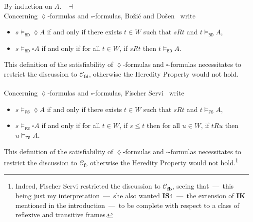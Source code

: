 \documentclass[draft]{article}
\newenvironment{proof}{{\bf Proof:}}{~$\dashv$\\}
\def\fcfra{\mathbf{f}}
\def\fbcfra{\mathbf{fb}}
\def\fdcfra{\mathbf{fd}}
\def\IS{\mathbf{IS}}
\def\IK{\mathbf{IK}}
\begin{document}
%
%
\begin{proof}
%
%
By induction on $A$.
%
%
\medskip
%
%
\end{proof}
%
%
%
%
Concerning $\lozenge$-formulas and $\square$-formulas, Bo\v{z}i\'{c} and Do\v{s}en~\cite{Bozic:Dosen:1984} write
%
%
\begin{itemize}
%
%
\item $s{\models_{\mathtt{BD}}}{\lozenge}A$ if and only if there exists $t{\in}W$ such that $s{R}t$ and $t{\models_{\mathtt{BD}}}A$,
%
%
%
%
\item $s{\models_{\mathtt{BD}}}{\square}A$ if and only if for all $t{\in}W$, if $s{R}t$ then $t{\models_{\mathtt{BD}}}A$.
%
%
%
%
\end{itemize}
%
%
%
%
This definition of the satisfiability of $\lozenge$-formulas and $\square$-formulas necessitates to restrict the discussion to ${\mathcal C}_{\fdcfra}$, otherwise the Heredity Property would not hold.
%
%
\\
\\
%
%
Concerning $\lozenge$-formulas and $\square$-formulas, Fischer Servi~\cite{FischerServi:1984} write
%
%
\begin{itemize}
%
%
\item $s{\models_{\mathtt{FS}}}{\lozenge}A$ if and only if there exists $t{\in}W$ such that $s{R}t$ and $t{\models_{\mathtt{FS}}}A$,
%
%
%
%
\item $s{\models_{\mathtt{FS}}}{\square}A$ if and only if for all $t{\in}W$, if $s{\leq}t$ then for all $u{\in}W$, if $t{R}u$ then $u{\models_{\mathtt{FS}}}A$.
%
%
%
%
\end{itemize}
%
%
%
%
This definition of the satisfiability of $\lozenge$-formulas and $\square$-formulas necessitates to restrict the discussion to ${\mathcal C}_{\fcfra}$, otherwise the Heredity Property would not hold.\footnote{Indeed, Fischer Servi restricted the discussion to ${\mathcal C}_{\fbcfra}$, seeing that~---~this being just my interpretation~---~she also wanted $\IS4$~---~the extension of $\IK$ mentioned in the introduction~---~to be complete with respect to a class of reflexive and transitive frames.}
\end{document}
